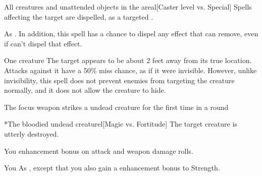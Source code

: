\begin{spelltargets}{All creatures and unattended objects in the area}l[Caster level vs. Special]
    \spelleffect Spells affecting the target are dispelled, as a targeted .
\end{spelltargets}
\spellnotes As . In addition, this spell has a chance to dispel any effect that  can remove, even if  can't dispel that effect.

\spellrng{\rngclose}
\spelldur{\durshort \dismissable}
\begin{spelltarget}{One creature}
    \spelleffect The target appears to be about 2 feet away from its true location. Attacks against it have a 50\% miss chance, as if it were invisible. However, unlike invisibility, this spell does not prevent enemies from targeting the creature normally, and it does not allow the creature to hide.
\end{spelltarget}

\spellrng{\rngclose}
\spelldur{\durshort}
\begin{spelltrigger}{The focus weapon strikes a \bloodied undead creature for the first time in a round}
    \begin{spelltarget}*{The bloodied undead creature}l[Magic vs. Fortitude]
        \spellsuccess The target creature is utterly destroyed.
    \end{spelltarget}
\end{spelltrigger}

\spelldur{\durshort}
\begin{spelltarget}{You}
    \spelleffect {} enhancement bonus on attack and weapon damage rolls. \spellbonusscalingdescription
\end{spelltarget}

\spelldur{\durshort}
\begin{spelltarget}{You}
    \spelleffect As , except that you also gain a  enhancement bonus to Strength.
\end{spelltarget}

